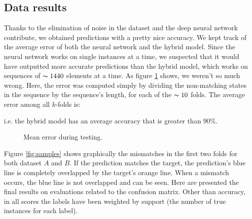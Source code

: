 \documentclass[10pt,a4paper]{article}
\begin{document}
\subsection{Data results}
	Thanks to the elimination of noise in the dataset and the deep neural network contribute, we obtained predictions with a pretty nice accuracy. We kept track of the average error of  both the neural network and the hybrid model. Since the neural network works on single instances at a time, we suspected that it would have outputted more accurate predictions than the hybrid model, which works on sequences of $\thicksim 1440$ elements at a time. As figure \ref{figure:err_graph} shows, we weren't so much wrong. Here, the error was computed simply by dividing the non-matching states in the sequence by the sequence's length, for each of the $\thicksim 10$ folds. The average error among all $k$-folds is:\\
	\begin{center}
	\end{center}
i.e. the hybrid model has an average accuracy that is greater than $90\%.$
	\begin{figure}
		\centering
		\caption{Mean error during testing.}
		\label{figure:err_graph}
	\end{figure}
	
	Figure \ref{fig:samples} shows graphically the mismatches in the first two folds for both dataset $A$ and $B$. If the prediction matches the target, the prediction's blue line is completely overlapped by the target's orange line. When a mismatch occurs, the blue line is not overlapped and can be seen. Here are presented the final results on evaluations related to the confusion matrix. Other than accuracy, in all scores the labels have been weighted by support (the number of true instances for each label).
	\begin{center}
	\end{center}
\end{document}
